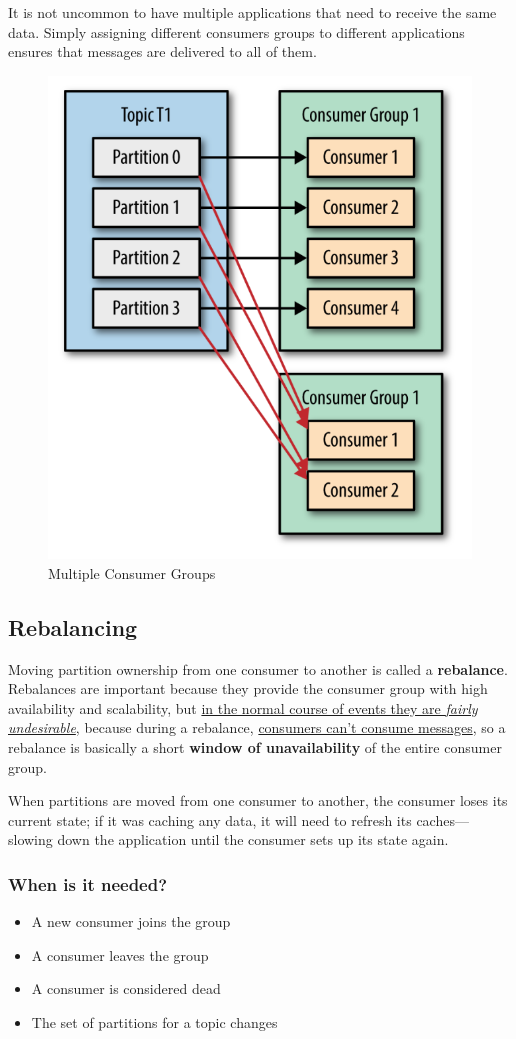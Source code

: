 \begin{paracol}{2}
   It is not uncommon to have multiple applications that need to receive the same data.
   Simply assigning different consumers groups to different applications ensures that messages are delivered to all of them.
   \switchcolumn
   \begin{figure}[htbp]
      \centering
      \includegraphics[width=0.5\columnwidth]{images/16/groups.png}
      \caption{Multiple Consumer Groups}
      \label{fig:16/groups}
   \end{figure}
\end{paracol}


\subsection{Rebalancing}

Moving partition ownership from one consumer to another is called a \textbf{rebalance}. Rebalances are important because they provide the consumer group with high availability and scalability,
but \ul{in the normal course of events they are \textit{fairly undesirable}}, because during a rebalance, \ul{consumers can’t consume messages}, so a rebalance is basically a short \textbf{window of unavailability} of the entire consumer group.

When partitions are moved from one consumer to another, the consumer loses its current state; if it was caching any data, it will need to refresh its caches—slowing down the application until the consumer sets up its state again.

\subsubsection{When is it needed?}
\begin{itemize}
   \item A new consumer joins the group
   \item A consumer leaves the group
   \item A consumer is considered dead
   \item The set of partitions for a topic changes
\end{itemize}

